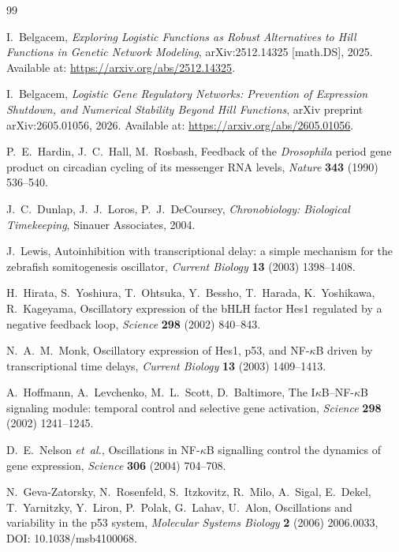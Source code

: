 \documentclass[sn-mathphys,Numbered]{sn-jnl}
\theoremstyle{thmstyleone}
\theoremstyle{thmstyletwo}
\theoremstyle{thmstylethree}
\begin{document}
\begin{thebibliography}{99}

I.~Belgacem,
\emph{Exploring Logistic Functions as Robust Alternatives to Hill Functions
in Genetic Network Modeling},
arXiv:2512.14325 [math.DS], 2025.
Available at: \url{https://arxiv.org/abs/2512.14325}.

I.~Belgacem,
\emph{Logistic Gene Regulatory Networks: Prevention of Expression Shutdown,
and Numerical Stability Beyond Hill Functions},
arXiv preprint arXiv:2605.01056, 2026.
Available at: \url{https://arxiv.org/abs/2605.01056}.

P.~E.~Hardin, J.~C.~Hall, M.~Rosbash,
Feedback of the \emph{Drosophila} period gene product on circadian
cycling of its messenger RNA levels,
\emph{Nature} \textbf{343} (1990) 536--540.

J.~C.~Dunlap, J.~J.~Loros, P.~J.~DeCoursey,
\emph{Chronobiology: Biological Timekeeping}, Sinauer Associates, 2004.

J.~Lewis,
Autoinhibition with transcriptional delay: a simple mechanism for the
zebrafish somitogenesis oscillator,
\emph{Current Biology} \textbf{13} (2003) 1398--1408.

H.~Hirata, S.~Yoshiura, T.~Ohtsuka, Y.~Bessho, T.~Harada, K.~Yoshikawa,
R.~Kageyama,
Oscillatory expression of the bHLH factor Hes1 regulated by a negative
feedback loop,
\emph{Science} \textbf{298} (2002) 840--843.

N.~A.~M.~Monk,
Oscillatory expression of Hes1, p53, and NF-$\kappa$B driven by
transcriptional time delays,
\emph{Current Biology} \textbf{13} (2003) 1409--1413.

A.~Hoffmann, A.~Levchenko, M.~L.~Scott, D.~Baltimore,
The I$\kappa$B--NF-$\kappa$B signaling module: temporal control and
selective gene activation,
\emph{Science} \textbf{298} (2002) 1241--1245.

D.~E.~Nelson \textit{et~al.},
Oscillations in NF-$\kappa$B signalling control the dynamics of gene
expression,
\emph{Science} \textbf{306} (2004) 704--708.

N.~Geva-Zatorsky, N.~Rosenfeld, S.~Itzkovitz, R.~Milo, A.~Sigal,
E.~Dekel, T.~Yarnitzky, Y.~Liron, P.~Polak, G.~Lahav, U.~Alon,
Oscillations and variability in the p53 system,
\emph{Molecular Systems Biology} \textbf{2} (2006) 2006.0033,
DOI: 10.1038/msb4100068.


\end{thebibliography}
\end{document}
